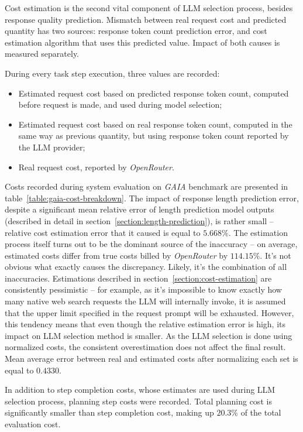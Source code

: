 \documentclass[a4paper,11pt,twoside]{report}
\theoremstyle{definition}
\begin{document}
Cost estimation is the second vital component of LLM selection process, besides response quality prediction. Mismatch between real request cost and predicted quantity has two sources: response token count prediction error, and cost estimation algorithm that uses this predicted value. Impact of both causes is measured separately.

During every task step execution, three values are recorded:

\begin{itemize}
    \item Estimated request cost based on predicted response token count, computed before request is made, and used during model selection;
    \item Estimated request cost based on real response token count, computed in the same way as previous quantity, but using response token count reported by the LLM provider;
    \item Real request cost, reported by \textit{OpenRouter}.
\end{itemize}

Costs recorded during system evaluation on \textit{GAIA} benchmark are presented in table~\ref{table:gaia-cost-breakdown}. The impact of response length prediction error, despite a significant mean relative error of length prediction model outputs (described in detail in section~\ref{section:length-prediction}), is rather small -- relative cost estimation error that it caused is equal to $5.668 \%$. The estimation process itself turns out to be the dominant source of the inaccuracy -- on average, estimated costs differ from true costs billed by \textit{OpenRouter} by $114.15 \%$. It's not obvious what exactly causes the discrepancy. Likely, it's the combination of all inaccuracies. Estimations described in section~\ref{section:cost-estimation} are consistently pessimistic -- for example, as it's impossible to know exactly how many native web search requests the LLM will internally invoke, it is assumed that the upper limit specified in the request prompt will be exhausted. However, this tendency means that even though the relative estimation error is high, its impact on LLM selection method is smaller. As the LLM selection is done using normalized costs, the consistent overestimation does not affect the final result. Mean average error between real and estimated costs after normalizing each set is equal to $0.4330$.

In addition to step completion costs, whose estimates are used during LLM selection process, planning step costs were recorded. Total planning cost is significantly smaller than step completion cost, making up $20.3 \%$ of the total evaluation cost.
\end{document}
